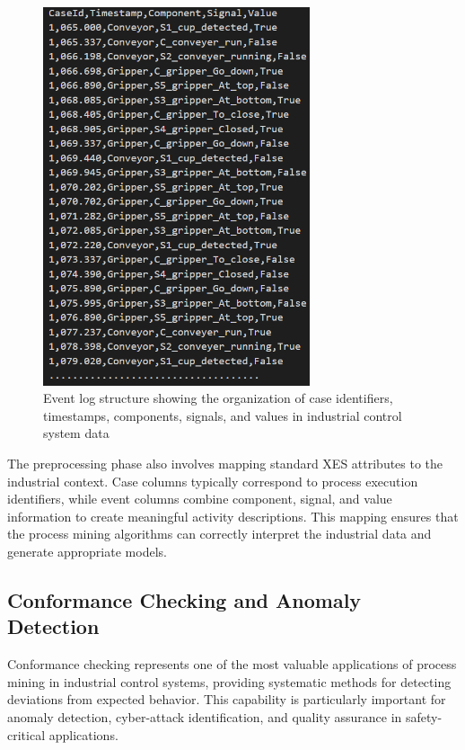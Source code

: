 \begin{figure}[h]
    \centering
    \includegraphics[width=0.7\textwidth]{MX_Papers/Paper5/images/EL.PNG}
    \caption{Event log structure showing the organization of case identifiers, timestamps, components, signals, and values in industrial control system data}
    \label{fig:event_log_structure}
\end{figure}

The preprocessing phase also involves mapping standard XES attributes to the industrial context. Case columns typically correspond to process execution identifiers, while event columns combine component, signal, and value information to create meaningful activity descriptions. This mapping ensures that the process mining algorithms can correctly interpret the industrial data and generate appropriate models.

\subsection{Conformance Checking and Anomaly Detection}

Conformance checking represents one of the most valuable applications of process mining in industrial control systems, providing systematic methods for detecting deviations from expected behavior. This capability is particularly important for anomaly detection, cyber-attack identification, and quality assurance in safety-critical applications.

